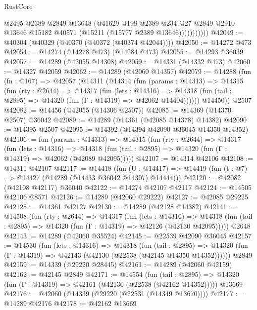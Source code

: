 \begin{lexlean}{RustCore}
\begin{coremodule}
                    @2495
                    @2389
                    @2849
                    @13648
                    (@41629
                      @198
                      @2389
                      @234
                      @27
                      @2849
                      @2910
                      @13646
                      @15182
                      @40571
                      (@15211 (@15777 @2389 @13646)))))))))))
@42049 := @40304 (@40329 (@40370 (@40372 (@40374 @42044))))
@42050 := @14272 @473
@42054 := @14274 (@14278 @473) (@14284 @473)
@42055 := @14293 @36039
@42057 := @14289 (@42055 @14308)
@42059 := @14331 (@14332 @473)
@42060 := @14327 @42059
@42062 := @14289 (@42060 @14357)
@42079 := @14288
    (fun (fn : @167) =>
    @42057
      (@14311
        (@14314
          (fun (params : @14313) =>
          @14315
            (fun (rty : @2644) =>
            @14317
              (fun (lets : @14316) =>
              @14318 (fun (tail : @2895) => @14320 (fun (Γ : @14319) => @42062 @14404))))))
        @14450))
    @2507
@42082 := @14456 (@42055 (@14306 @2507))
@42085 := @14369 (@14370 @2507) @36042
@42089 := @14289 (@14361 (@42085 @14378) @14382)
@42090 := @14395 @2507
@42095 := @14392 (@14394 @42090 @36045 @14350 @14352)
@42106 := fun (params : @14313) =>
  @14315
    (fun (rty : @2644) =>
    @14317
      (fun (lets : @14316) =>
      @14318 (fun (tail : @2895) => @14320 (fun (Γ : @14319) => @42062 (@42089 @42095)))))
@42107 := @14314 @42106
@42108 := @14311 @42107
@42117 := @14418
    (fun (U : @14417) => @14419 (fun (t : @7) => @14427 (@14289 (@14433 @36042 @14307) @14444)))
@42120 := @42082 (@42108 @42117) @36040
@42122 := @14274 @42107 @42117
@42124 := @14505 @42106 @8571
@42126 := @14289 (@42060 @29222)
@42127 := @42085 @29225
@42128 := @14361 @42127
@42130 := @14289 (@42128 @14382)
@42141 := @14508
    (fun (rty : @2644) =>
    @14317
      (fun (lets : @14316) =>
      @14318 (fun (tail : @2895) => @14320 (fun (Γ : @14319) => @42126 (@42130 @42095)))))
    @2648
@42143 := @14289 (@42060 @35524)
@42145 := @22539 @42090 @36045
@42157 := @14530
    (fun (lets : @14316) =>
    @14318
      (fun (tail : @2895) =>
      @14320 (fun (Γ : @14319) => @42143 (@42130 (@22538 (@42145 @14350 @14352))))))
    @2849
@42159 := @14339 (@29220 @28445)
@42161 := @14289 (@42060 @42159)
@42162 := @42145 @2849
@42171 := @14554
    (fun (tail : @2895) => @14320 (fun (Γ : @14319) => @42161 (@42130 (@22538 (@42162 @14352)))))
    @13669
@42176 := @42060 (@14339 (@29220 (@22531 (@14349 @13670))))
@42177 := @14289 @42176
@42178 := @42162 @13669

\end{coremodule}
\end{lexlean}
